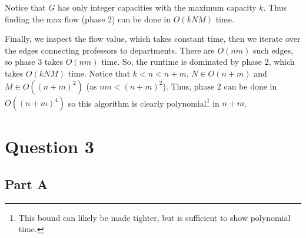 \documentclass[11pt]{exam}
\begin{document}
Notice that $ G $ has only integer capacities with the maximum
capacity $ k $. Thus finding the max flow (phase 2) can be done in $
O(kNM) $ time.

Finally, we inspect the flow value, which takes constant time, then
we iterate over the edges connecting professors to departments. There
are $O( nm )$ such edges, so phase 3 takes $ O(nm) $ time. So, the
runtime is dominated by phase 2, which takes $ O(kNM) $ time. Notice
that $ k < n < n+m $, $ N \in O(n + m) $ and $ M \in O((n + m)^2) $
(as $ nm<(n+m)^2 $). Thus, phase 2 can be done in $ O((n+m)^4) $ so
this algorithm is clearly polynomial\footnote{This bound can likely
be made tighter, but is sufficient to show polynomial time.} in $ n + m $.

\section{Question 3}

\subsection{Part A}
\end{document}
